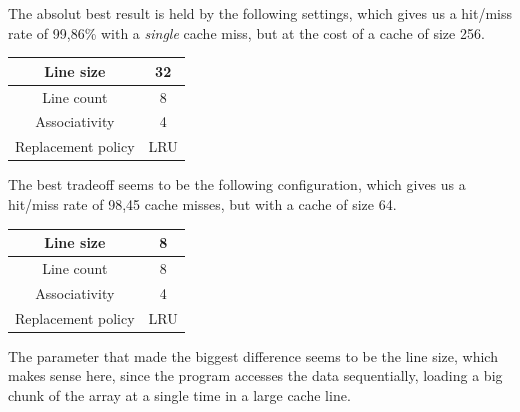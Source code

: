 \documentclass[a4paper]{report}
\begin{document}
The absolut best result is held by the following settings, which gives us a hit/miss rate of 99,86\% with a
\emph{single} cache miss, but at the cost of a cache of size 256.

\begin{center}
	\begin{tabular}{|cc|}
		\hline
		Line size          & 32  \\
		\hline
		Line count         & 8   \\
		\hline
		Associativity      & 4   \\
		\hline
		Replacement policy & LRU \\
		\hline
	\end{tabular}
\end{center}

The best tradeoff seems to be the following configuration, which gives us a hit/miss rate of 98,45%
cache misses, but with a cache of size 64.

\begin{center}
	\begin{tabular}{|cc|}
		\hline
		Line size          & 8   \\
		\hline
		Line count         & 8   \\
		\hline
		Associativity      & 4   \\
		\hline
		Replacement policy & LRU \\
		\hline
	\end{tabular}
\end{center}

The parameter that made the biggest difference seems to be the line size, which makes sense here, since the
program accesses the data sequentially, loading a big chunk of the array at a single time in a large cache
line.
\end{document}
